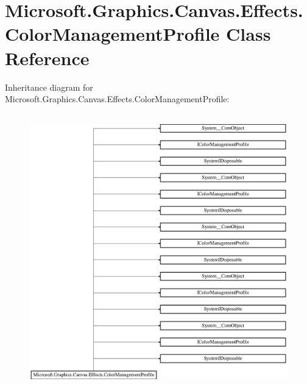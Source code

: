 \hypertarget{class_microsoft_1_1_graphics_1_1_canvas_1_1_effects_1_1_color_management_profile}{}\section{Microsoft.\+Graphics.\+Canvas.\+Effects.\+Color\+Management\+Profile Class Reference}
\label{class_microsoft_1_1_graphics_1_1_canvas_1_1_effects_1_1_color_management_profile}
Inheritance diagram for Microsoft.\+Graphics.\+Canvas.\+Effects.\+Color\+Management\+Profile\+:\begin{figure}[H]
\begin{center}
\leavevmode
\includegraphics[height=12.000000cm]{class_microsoft_1_1_graphics_1_1_canvas_1_1_effects_1_1_color_management_profile}
\end{center}
\end{figure}
